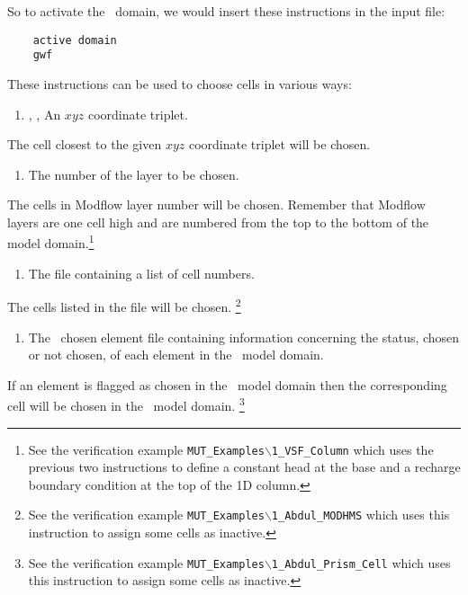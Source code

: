 So to activate the \gwf\ domain, we would insert these instructions in the input file:
\begin{verbatim}
    active domain
    gwf
\end{verbatim}

These instructions can be used to choose cells in various ways:

    {
        \squish
        \begin{enumerate}
        \item {}, ,   An $xyz$ coordinate triplet.
        \end{enumerate}
        The cell closest to the given $xyz$ coordinate triplet will be chosen.
    }

    {
        \squish
        \begin{enumerate}
        \item {}  The number of the layer to be chosen.
        \end{enumerate}
        The cells in Modflow layer number  will be chosen.  Remember that Modflow layers are one cell high and are numbered from the top to the bottom of the model domain.\footnote{ See the verification example \texttt{MUT\_Examples$\backslash$1\_VSF\_Column} which uses the previous two instructions to define a constant head at  the base  and a recharge boundary condition at the top of the 1D column.}
    }

    {
        \squish
        \begin{enumerate}
        \item {}  The file  containing a list of cell numbers.
        \end{enumerate}
        The cells listed in the file  will be chosen.  \footnote{ See the verification example \texttt{MUT\_Examples$\backslash$1\_Abdul\_MODHMS} which uses this instruction to assign some cells as inactive.}
    }

\pagebreak
{}
    {
        \squish
        \begin{enumerate}
        \item {}  The \gb\ chosen element file  containing information concerning the status, chosen or not chosen, of each element in the \gb\ model domain.
        \end{enumerate}
          If an element is flagged as chosen in the \gb\ model domain then the corresponding cell will be chosen in the \mfus\ model domain.  \footnote{ See the verification example \texttt{MUT\_Examples$\backslash$1\_Abdul\_Prism\_Cell} which uses this instruction to assign some cells as inactive.}
    }

